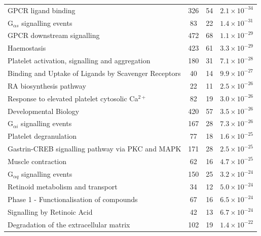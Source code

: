 \begin{table}[!hp]
{\begin{tabular}{lccc}
  \rowcolor{Cluster_Red!20} 
  GPCR ligand binding & 326 &  54 & $2.1 \times 10^{-34}$ \\
  \rowcolor{Cluster_Red!15} 
  G$_{\alpha s}$ signalling events &  83 &  22 & $1.4 \times 10^{-31}$ \\
  \rowcolor{Cluster_Red!20} 
  GPCR downstream signalling & 472 &  68 & $1.1 \times 10^{-29}$ \\
  \rowcolor{Cluster_Red!15} 
  Haemostasis & 423 &  61 & $3.3 \times 10^{-29}$ \\
  \rowcolor{Cluster_Red!20} 
  Platelet activation, signalling and aggregation & 180 &  31 & $7.1 \times 10^{-28}$ \\
  \rowcolor{Cluster_Red!15} 
  Binding and Uptake of Ligands by Scavenger Receptors &  40 &  14 & $9.9 \times 10^{-27}$ \\
  \rowcolor{Cluster_Red!20} 
  RA biosynthesis pathway &  22 &  11 & $2.5 \times 10^{-26}$ \\
  \rowcolor{Cluster_Red!15} 
  Response to elevated platelet cytosolic Ca$^{2+}$ &  82 &  19 & $3.0 \times 10^{-26}$ \\
  \rowcolor{Cluster_Red!20} 
  Developmental Biology & 420 &  57 & $3.5 \times 10^{-26}$ \\
  \rowcolor{Cluster_Red!15} 
  G$_{\alpha i}$ signalling events & 167 &  28 & $7.3 \times 10^{-26}$ \\
  \rowcolor{Cluster_Red!20} 
  Platelet degranulation &  77 &  18 & $1.6 \times 10^{-25}$ \\
  \rowcolor{Cluster_Red!15} 
  Gastrin-CREB signalling pathway via PKC and MAPK & 171 &  28 & $2.5 \times 10^{-25}$ \\
  \rowcolor{Cluster_Red!20} 
  Muscle contraction &  62 &  16 & $4.7 \times 10^{-25}$ \\
  \rowcolor{Cluster_Red!15} 
  G$_{\alpha q}$ signalling events & 150 &  25 & $3.2 \times 10^{-24}$ \\
  \rowcolor{Cluster_Red!20} 
  Retinoid metabolism and transport &  34 &  12 & $5.0 \times 10^{-24}$ \\
  \rowcolor{Cluster_Red!15} 
  Phase 1 - Functionalisation of compounds &  67 &  16 & $6.5 \times 10^{-24}$ \\
  \rowcolor{Cluster_Red!20} 
  Signalling by Retinoic Acid &  42 &  13 & $6.7 \times 10^{-24}$ \\
  \rowcolor{Cluster_Red!15} 
  Degradation of the extracellular matrix & 102 &  19 & $1.4 \times 10^{-22}$ \\ 
  \hline
\end{tabular}
}
\end{table}

